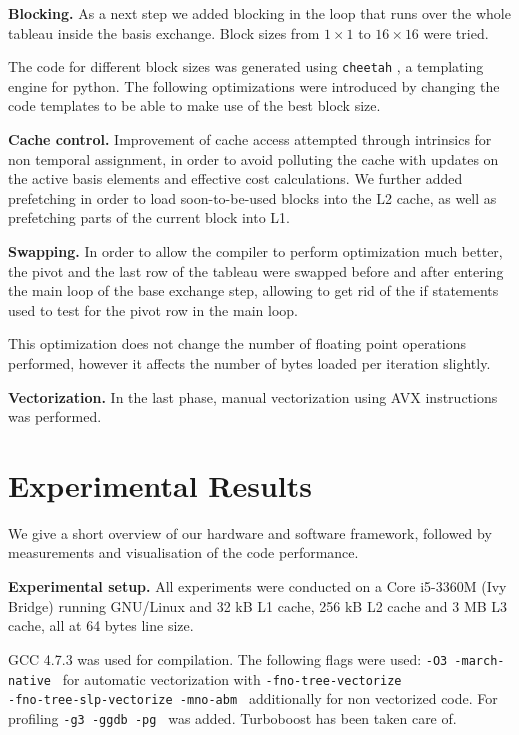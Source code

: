 \documentclass[letterpaper]{article}
\newcommand{\mypar}[1]{{\bf #1.}}
\begin{document}
\mypar{Blocking}
As a next step we added blocking in the loop that runs over the whole tableau 
inside the basis exchange. Block sizes from $1 \times 1$ to $16 \times 16$ were tried.

The code for different block sizes was generated using 
{\tt cheetah} \cite{cheetah}, a templating engine for python. The following optimizations were introduced
by changing the code templates to be able to make use of the best block size.

\mypar{Cache control}
Improvement of cache access attempted through intrinsics for non temporal assignment, in order to avoid polluting the cache with updates on the active basis elements and
effective cost calculations. We further added prefetching in order to load soon-to-be-used blocks into the L2 cache, as well as prefetching parts of the current block into L1.

\mypar{Swapping}
In order to allow the compiler to perform optimization much better, the pivot and the last row
of the tableau were swapped before and after entering the main loop of the base exchange step,
allowing to get rid of the if statements used to test for the pivot row in the main loop.

This optimization does not change the number of floating point operations performed, however it affects the number of bytes loaded per iteration slightly.

\mypar{Vectorization}
In the last phase, manual vectorization using AVX instructions was performed.


\section{Experimental Results}\label{sec:exp}

We give a short overview of our hardware and software framework, followed by measurements and visualisation of the code performance.

\mypar{Experimental setup}
All experiments were conducted on a Core i5-3360M (Ivy Bridge) running GNU/Linux and 32 kB L1 cache, 256 kB L2 cache and 3 MB L3 cache, all at 64 bytes line size.

GCC 4.7.3 was used for compilation. The following flags were used:
{\tt -O3 -march\--native  } for automatic vectorization with {\tt -fno\--tree\--vectorize \\ -fno\--tree\--slp\--vectorize -mno\--abm } additionally for non vectorized code.
For profiling {\tt -g3 -ggdb -pg } was added. Turboboost has been taken care of.
\end{document}
